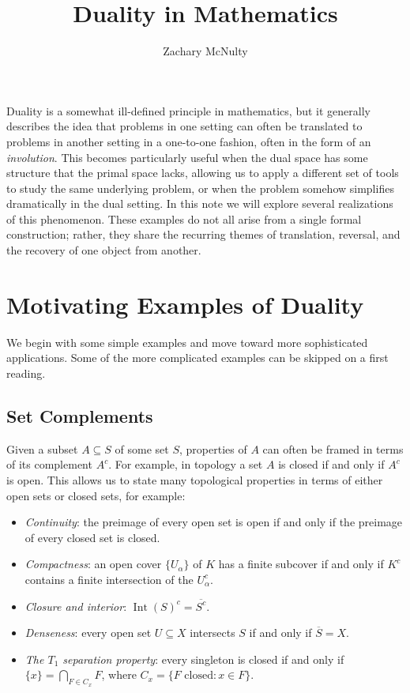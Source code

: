 \documentclass[11pt]{article}
\title{Duality in Mathematics}
\author{Zachary McNulty}
\date{}
\begin{document}
\maketitle

Duality is a somewhat ill-defined principle in mathematics, but it generally
describes the idea that problems in one setting can often be translated to
problems in another setting in a one-to-one fashion, often in the form of an
\emph{involution}. This becomes particularly useful when the dual space has
some structure that the primal space lacks, allowing us to apply a different
set of tools to study the same underlying problem, or when the problem
somehow simplifies dramatically in the dual setting. In this note we will
explore several realizations of this phenomenon. These examples do not all
arise from a single formal construction; rather, they share the recurring
themes of translation, reversal, and the recovery of one object from another.


\section{Motivating Examples of Duality}

We begin with some simple examples and move toward more sophisticated
applications. Some of the more complicated examples can be skipped on a first
reading.


\subsection{Set Complements}

Given a subset $A\subseteq S$ of some set $S$, properties of $A$ can often be framed in terms
of its complement $A^c$. For example, in topology a set $A$ is closed if and
only if $A^c$ is open. This allows us to state many topological properties in
terms of either open sets or closed sets, for example:

\begin{itemize}
  \item \emph{Continuity}: the preimage of every open set is open if and only
  if the preimage of every closed set is closed.
  \item \emph{Compactness}: an open cover $\{U_\alpha\}$ of $K$ has a finite
  subcover if and only if $K^c$ contains a finite intersection of the
  $U_\alpha^c$.
  \item \emph{Closure and interior}: $\operatorname{Int}(S)^c=\overline{S^c}$.
  \item \emph{Denseness}: every open set $U\subseteq X$ intersects $S$ if and
  only if $\overline S=X$.
  \item \emph{The $T_1$ separation property}: every singleton is closed if and
  only if $\{x\}=\bigcap_{F\in C_x}F$, where
  $C_x=\{F\text{ closed}:x\in F\}$.
\end{itemize}
\end{document}
